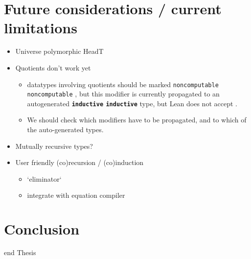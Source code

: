 \documentclass[titlepage]{report}
\newenvironment{todo}{%
\definecolor{shadecolor}{HTML}{F8E0E0}%
\begin{shaded}%
\begin{trivlist}                         
    \item[\hskip \labelsep {\bfseries Todo:}]}{\end{trivlist}\end{shaded}}
\newenvironment{leanhidden}{\expandafter\comment}{\expandafter\endcomment}
\newcommand\lean[1]{%
\ifx\leanmode\undefined%
\def\leanmode{1}%
\texttt{\small #1}%
\undef\leanmode%
\else%
\texttt{#1}%
\fi%
}
\newcommand\keyword[1]{{\color{keywordcolor} \textbf{\lean{#1}}}}
\newcommand\inductive{{\keyword{inductive}}}
\begin{document}
\chapter{Future considerations / current limitations}
\label{ch:limitations}
















\begin{todo}
    


    \begin{itemize}
        \item Universe polymorphic HeadT
        
        \item Quotients don't work yet
              \begin{itemize}
                \item datatypes involving quotients should be marked \lean{noncomputable}, but this modifier is currently propagated to an autogenerated \inductive{} type, but Lean does not accept .

                \item We should check which modifiers have to be propagated, and to which of the auto-generated types.
              \end{itemize}
        

        \item Mutually recursive types?
        
        \item User friendly (co)recursion / (co)induction
                \begin{itemize}
                    \item `eliminator`
                    \item integrate with equation compiler
                \end{itemize}
    \end{itemize}
\end{todo}









\chapter{Conclusion}
\label{ch:conclusion}















\begin{leanhidden}
    end Thesis
\end{leanhidden}





\end{document}
